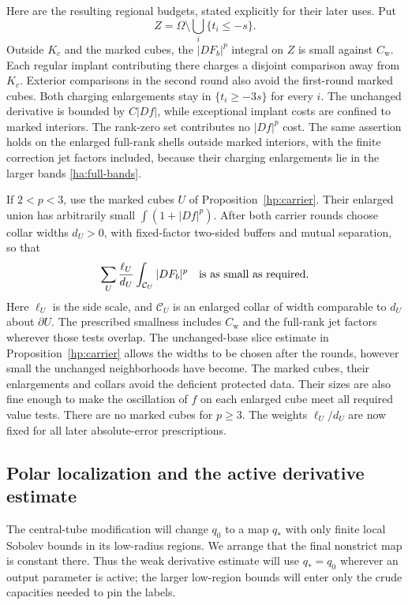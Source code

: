 \documentclass[11pt]{article}
\numberwithin{equation}{section}
\theoremstyle{definition}
\theoremstyle{remark}
\begin{document}
Here are the resulting regional budgets, stated explicitly for their
later uses.  Put
\[
                     Z=\Omega\setminus\bigcup_i\{t_i\le-s\}.
\]
Outside $K_c$ and the marked cubes, the $|DF_b|^p$ integral on $Z$ is
small against $C_{\mathrm w}$.  Each regular implant contributing
there charges a disjoint comparison away from $K_c$.  Exterior
comparisons in the second round also avoid the first-round marked
cubes.  Both charging enlargements stay in $\{t_i\ge-3s\}$ for every
$i$.  The unchanged derivative is bounded by $C|Df|$, while exceptional
implant costs are confined to marked interiors.  The rank-zero set
contributes no $|Df|^p$ cost.  The same assertion holds on the enlarged
full-rank shells outside marked interiors, with the finite correction
jet factors included, because their charging enlargements lie in the
larger bands \eqref{ha:full-bands}.

If $2<p<3$, use the marked cubes $U$ of
Proposition~\ref{hp:carrier}.  Their enlarged union has arbitrarily
small $\int(1+|Df|^p)$.  After both carrier rounds choose collar widths
$d_U>0$, with fixed-factor two-sided buffers and mutual separation,
so that
\begin{equation}\label{ha:collar-budget}
 \sum_U\frac{\ell_U}{d_U}
             \int_{\mathcal C_U}|DF_b|^p
                  \quad\hbox{is as small as required}.
\end{equation}
Here $\ell_U$ is the side scale, and $\mathcal C_U$ is an enlarged
collar of width comparable to $d_U$ about $\partial U$.
The prescribed smallness includes $C_{\mathrm w}$ and the full-rank
jet factors wherever those tests overlap.  The unchanged-base slice
estimate in Proposition~\ref{hp:carrier} allows the widths to be
chosen after the rounds, however small the unchanged neighborhoods
have become.  The marked cubes, their enlargements and collars avoid
the deficient protected data.  Their sizes are also fine enough to
make the oscillation of $f$ on each enlarged cube meet all required
value tests.  There are no marked cubes for $p\ge3$.  The weights
$\ell_U/d_U$ are now fixed for all later absolute-error prescriptions.

\subsection{Polar localization and the active derivative estimate}
\label{ha:active-localization}

The central-tube modification will change $q_0$ to a map $q_*$
with only finite local Sobolev bounds in its low-radius regions.
We arrange that the final nonstrict map is constant there.
Thus the weak derivative estimate will use $q_*=q_0$ wherever
an output parameter is active; the larger low-region bounds will
enter only the crude capacities needed to pin the labels.
\end{document}
